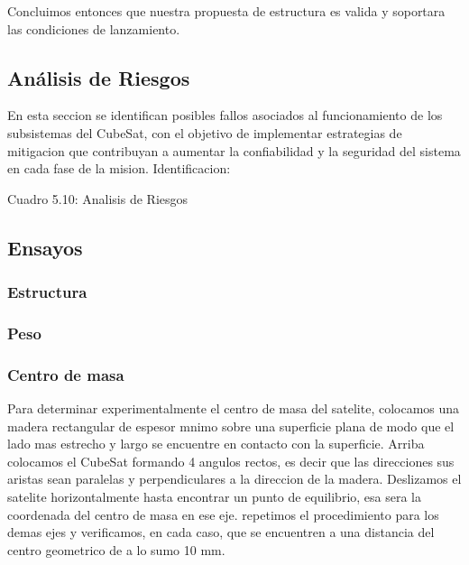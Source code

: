     Concluimos entonces que nuestra propuesta de estructura es valida y soportara las condiciones de lanzamiento.

  \subsection{Análisis de Riesgos}
    En esta seccion se identifican posibles fallos asociados al funcionamiento de los subsistemas
    del CubeSat, con el objetivo de implementar estrategias de mitigacion que contribuyan a
    aumentar la confiabilidad y la seguridad del sistema en cada fase de la mision. Identificacion:

    Cuadro 5.10: Analisis de Riesgos

  \subsection{Ensayos}
    \subsubsection{Estructura}
    \subsubsection{Peso}
    \subsubsection{Centro de masa}
    Para determinar experimentalmente el centro de masa del satelite, colocamos una madera
    rectangular de espesor mnimo sobre una superficie plana de modo que el lado mas estrecho
    y largo se encuentre en contacto con la superficie. Arriba colocamos el CubeSat formando 4
    angulos rectos, es decir que las direcciones sus aristas sean paralelas y perpendiculares a la
    direccion de la madera. Deslizamos el satelite horizontalmente hasta encontrar un punto de
    equilibrio, esa sera la coordenada del centro de masa en ese eje. repetimos el procedimiento
    para los demas ejes y verificamos, en cada caso, que se encuentren a una distancia del centro
    geometrico de a lo sumo 10 mm.


